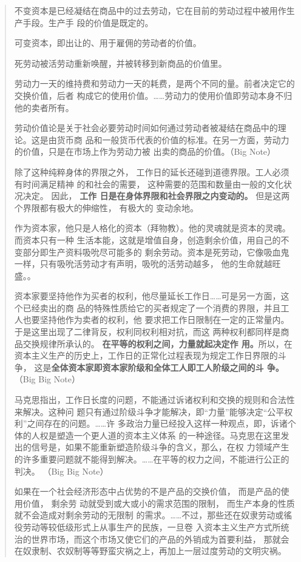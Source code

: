 \begin{quotation}
不变资本是已经凝结在商品中的过去劳动，它在目前的劳动过程中被用作生产手段。生产手
段的价值是既定的。

可变资本，即出让的、用于雇佣的劳动者的价值。

死劳动被活劳动重新唤醒，并被转移到新商品的价值里。


劳动力一天的维持费和劳动力一天的耗费，是两个不同的量。前者决定它的交换价值，后者
构成它的使用价值。……劳动力的使用价值即劳动本身不归他的卖者所有。

劳动价值论是关于社会必要劳动时间如何通过劳动者被凝结在商品中的理论。这是由货币商
品和一般货币代表的价值的标准。在另一方面，劳动力的价值，只是在市场上作为劳动力被
出卖的商品的价值。（Big Note）

除了这种纯粹身体的界限之外， 工作日的延长还碰到道德界限。工人必须有时间满足精神
的和社会的需要， 这种需要的范围和数量由一般的文化状况决定。 因此， \textbf{工作
日是在身体界限和社会界限之内变动的。} 但是这两个界限都有极大的伸缩性， 有极大的
变动余地。



作为资本家，他只是人格化的资本（拜物教）。他的灵魂就是资本的灵魂。而资本只有一种
生活本能，这就是增值自身，创造剩余价值，用自己的不变部分即生产资料吸吮尽可能多的
剩余劳动。资本是死劳动，它像吸血鬼一样，只有吸吮活劳动才有声明，吸吮的活劳动越多，
他的生命就越旺盛。。

资本家要坚持他作为买者的权利，他尽量延长工作日……可是另一方面，这个已经卖出的商
品的特殊性质给它的买者规定了一个消费的界限，并且工人也要坚持他作为卖者的权利，他
要求把工作日限制在一定的正常量内。于是这里出现了二律背反，权利同权利相对抗，而这
两种权利都同样是商品交换规律所承认的。 \textbf{在平等的权利之间，力量就起决定作
用。}所以，在资本主义生产的历史上，工作日的正常化过程表现为规定工作日界限的斗争，
这是\textbf{全体资本家即资本家阶级和全体工人即工人阶级之间的斗
争。}（Big Big Note）

马克思指出，工作日长度的问题，不能通过诉诸权利和交换的规则和合法性来解决。这种问
题只有通过阶级斗争才能解决，即“力量”能够决定“公平权利”之间存在的问题。……许
多政治力量已经投入这样一种观点，即，诉诸个体的人权是塑造一个更人道的资本主义体系
的一种途径。马克思在这里发出的信号是，如果不能重新塑造阶级斗争的含义，那么，在权
力领域产生的许多重要问题就不能得到解决。……在平等的权力之间，不能进行公正的判决。
（Big Big Note）

如果在一个社会经济形态中占优势的不是产品的交换价值， 而是产品的使用价值， 剩余劳
动就受到或大或小的需求范围的限制， 而生产本身的性质就不会造成对剩余劳动的无限制
的需求。……不过，那些还在奴隶劳动或徭役劳动等较低级形式上从事生产的民族，一旦卷
入资本主义生产方式所统治的世界市场，而这个市场又使它们的产品的外销成为首要利益，
那就会在奴隶制、农奴制等等野蛮灾祸之上，再加上一层过度劳动的文明灾祸。


\end{quotation}
